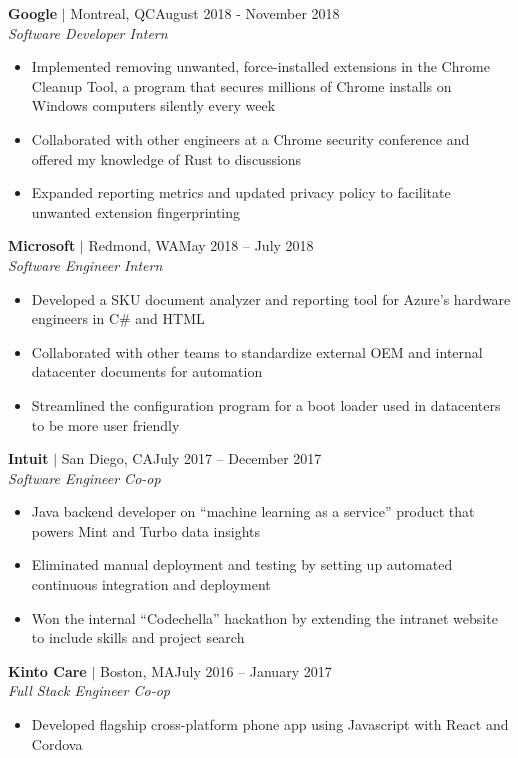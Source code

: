 \documentclass[overlapped,line]{res}
\begin{document}
\begin{resume}
\textbf{Google} $|$ Montreal, QC\hfill August 2018 - November 2018\\
{\sl Software Developer Intern}
\begin{itemize} \itemsep -2pt
	\item Implemented removing unwanted, force-installed extensions in the Chrome Cleanup Tool, a program that secures millions of Chrome installs on Windows computers silently every week
    \item Collaborated with other engineers at a Chrome security conference and
      offered my knowledge of Rust to discussions
    \item Expanded reporting metrics and updated privacy policy to facilitate unwanted extension fingerprinting
\end{itemize}

\textbf{Microsoft} $|$ Redmond, WA\hfill May 2018 \--- July 2018\\
{\sl Software Engineer Intern}
\begin{itemize} \itemsep -2pt
	\item Developed a SKU document analyzer and reporting tool for Azure's hardware engineers in C\# and HTML
	\item Collaborated with other teams to standardize external OEM and internal datacenter documents for automation
	\item Streamlined the configuration program for a boot loader used in datacenters to be more user friendly
\end{itemize}

\textbf{Intuit} $|$ San Diego, CA\hfill July 2017 \--- December 2017\\
{\sl Software Engineer Co-op}
\begin{itemize} \itemsep -2pt
	\item Java backend developer on ``machine learning as a service'' product that powers Mint and Turbo data insights
	\item Eliminated manual deployment and testing by setting up automated continuous integration and deployment
	\item Won the internal ``Codechella'' hackathon by extending the intranet website to include skills and project search
\end{itemize}

\textbf{Kinto Care} $|$ Boston, MA\hfill July 2016 \--- January 2017\\
{\sl Full Stack Engineer Co-op}
\begin{itemize} \itemsep -2pt
	\item Developed flagship cross-platform phone app using Javascript with React and Cordova
\end{itemize}


\end{resume}
\end{document}
